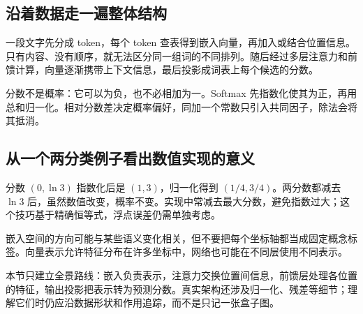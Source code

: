 \subsection*{沿着数据走一遍整体结构}
一段文字先分成 token，每个 token 查表得到嵌入向量，再加入或结合位置信息。只有内容、没有顺序，就无法区分同一组词的不同排列。随后经过多层注意力和前馈计算，向量逐渐携带上下文信息，最后投影成词表上每个候选的分数。

分数不是概率：它可以为负，也不必相加为一。Softmax 先指数化使其为正，再用总和归一化。相对分数差决定概率偏好，同加一个常数只引入共同因子，除法会将其抵消。

\subsection*{从一个两分类例子看出数值实现的意义}
分数 $(0,\ln3)$ 指数化后是 $(1,3)$，归一化得到 $(1/4,3/4)$。两分数都减去 $\ln3$ 后，虽然数值改变，概率不变。实现中常减去最大分数，避免指数过大；这个技巧基于精确恒等式，浮点误差仍需单独考虑。

嵌入空间的方向可能与某些语义变化相关，但不要把每个坐标轴都当成固定概念标签。向量表示允许特征分布在许多坐标中，网络也可能在不同层使用不同表示。

本节只建立全景路线：嵌入负责表示，注意力交换位置间信息，前馈层处理各位置的特征，输出投影把表示转为预测分数。真实架构还涉及归一化、残差等细节；理解它们时仍应沿数据形状和作用追踪，而不是只记一张盒子图。
